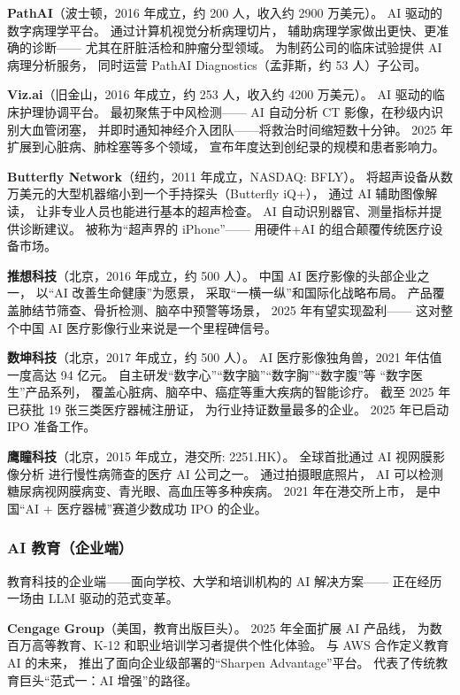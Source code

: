 \textbf{PathAI}（波士顿，2016 年成立，约 200 人，收入约 2900 万美元）。
AI 驱动的数字病理学平台。
通过计算机视觉分析病理切片，
辅助病理学家做出更快、更准确的诊断——
尤其在肝脏活检和肿瘤分型领域。
为制药公司的临床试验提供 AI 病理分析服务，
同时运营 PathAI Diagnostics（孟菲斯，约 53 人）子公司。

\textbf{Viz.ai}（旧金山，2016 年成立，约 253 人，收入约 4200 万美元）。
AI 驱动的临床护理协调平台。
最初聚焦于中风检测——
AI 自动分析 CT 影像，在秒级内识别大血管闭塞，
并即时通知神经介入团队——将救治时间缩短数十分钟。
2025 年扩展到心脏病、肺栓塞等多个领域，
宣布年度达到创纪录的规模和患者影响力。

\textbf{Butterfly Network}（纽约，2011 年成立，NASDAQ: BFLY）。
将超声设备从数万美元的大型机器缩小到一个手持探头（Butterfly iQ+），
通过 AI 辅助图像解读，
让非专业人员也能进行基本的超声检查。
AI 自动识别器官、测量指标并提供诊断建议。
被称为``超声界的 iPhone''——
用硬件+AI 的组合颠覆传统医疗设备市场。

\textbf{推想科技}（北京，2016 年成立，约 500 人）。
中国 AI 医疗影像的头部企业之一，
以``AI 改善生命健康''为愿景，
采取``一横一纵''和国际化战略布局。
产品覆盖肺结节筛查、骨折检测、脑卒中预警等场景，
2025 年有望实现盈利——
这对整个中国 AI 医疗影像行业来说是一个里程碑信号。

\textbf{数坤科技}（北京，2017 年成立，约 500 人）。
AI 医疗影像独角兽，2021 年估值一度高达 94 亿元。
自主研发``数字心''``数字脑''``数字胸''``数字腹''等
``数字医生''产品系列，
覆盖心脏病、脑卒中、癌症等重大疾病的智能诊疗。
截至 2025 年已获批 19 张三类医疗器械注册证，
为行业持证数量最多的企业。
2025 年已启动 IPO 准备工作。

\textbf{鹰瞳科技}（北京，2015 年成立，港交所: 2251.HK）。
全球首批通过 AI 视网膜影像分析
进行慢性病筛查的医疗 AI 公司之一。
通过拍摄眼底照片，
AI 可以检测糖尿病视网膜病变、青光眼、高血压等多种疾病。
2021 年在港交所上市，
是中国``AI + 医疗器械''赛道少数成功 IPO 的企业。

\subsubsection{AI 教育（企业端）}

教育科技的企业端——面向学校、大学和培训机构的 AI 解决方案——
正在经历一场由 LLM 驱动的范式变革。

\textbf{Cengage Group}（美国，教育出版巨头）。
2025 年全面扩展 AI 产品线，
为数百万高等教育、K-12 和职业培训学习者提供个性化体验。
与 AWS 合作定义教育 AI 的未来，
推出了面向企业级部署的``Sharpen Advantage''平台。
代表了传统教育巨头``范式一：AI 增强''的路径。


